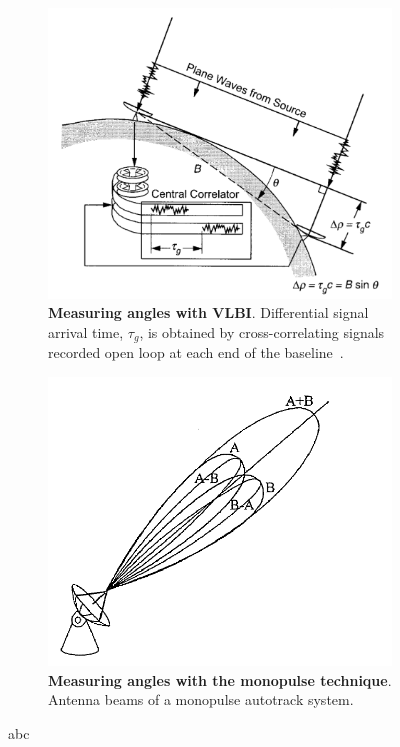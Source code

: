 \begin{figure}
    \centering
    \begin{subfigure}{.48\textwidth}
        \centering
        \captionsetup{format=hang} %
        \includegraphics[width=.99\linewidth]{graphics/vlbi.PNG}
        \caption{
            \textbf{Measuring angles with VLBI}. Differential signal arrival time,
            $\tau_g$, is obtained by cross-correlating signals recorded open loop at
            each end of the baseline~\cite[p.~48]{Catherine2005}.
        }
        \label{fig:monopulse}
    \end{subfigure}\hspace{0.03\textwidth}
    \begin{subfigure}{.48\textwidth}
        \centering
        \captionsetup{format=hang} %
        \includegraphics[width=.99\linewidth]{graphics/monopulse.PNG}
        \caption{
            \textbf{Measuring angles with the monopulse technique}. Antenna beams of a
            monopulse autotrack system.~\cite[p.~196]{Montenbruck2000}
        }
        \label{fig:vlbi}
    \end{subfigure}
    \caption{abc}
    \label{fig:test}
\end{figure}


